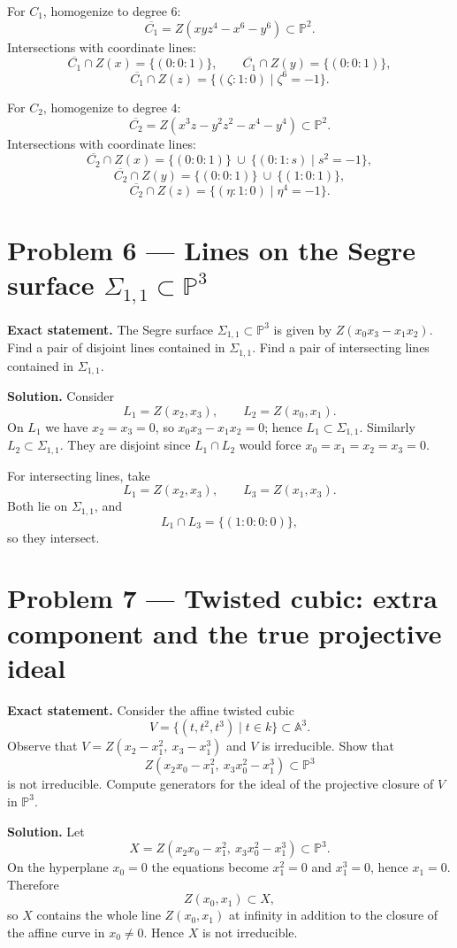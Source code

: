 \documentclass[12pt,a4paper]{article}
\theoremstyle{plain}
\theoremstyle{definition}      %
\begin{document}
For $C_1$, homogenize to degree $6$:
\[
\overline{C_1}=Z(xyz^4-x^6-y^6)\subset \mathbb{P}^2.
\]
Intersections with coordinate lines:
\[
\overline{C_1}\cap Z(x)=\{(0:0:1)\},
\qquad
\overline{C_1}\cap Z(y)=\{(0:0:1)\},
\]
\[
\overline{C_1}\cap Z(z)=\{(\zeta:1:0)\mid \zeta^6=-1\}.
\]

For $C_2$, homogenize to degree $4$:
\[
\overline{C_2}=Z(x^3z-y^2z^2-x^4-y^4)\subset \mathbb{P}^2.
\]
Intersections with coordinate lines:
\[
\overline{C_2}\cap Z(x)=\{(0:0:1)\}\ \cup\ \{(0:1:s)\mid s^2=-1\},
\]
\[
\overline{C_2}\cap Z(y)=\{(0:0:1)\}\ \cup\ \{(1:0:1)\},
\]
\[
\overline{C_2}\cap Z(z)=\{(\eta:1:0)\mid \eta^4=-1\}.
\]

\section*{Problem 6 — Lines on the Segre surface $\Sigma_{1,1}\subset \mathbb{P}^3$}

\textbf{Exact statement.}
The Segre surface $\Sigma_{1,1}\subset \mathbb{P}^3$ is given by $Z(x_0x_3-x_1x_2)$.
Find a pair of disjoint lines contained in $\Sigma_{1,1}$.
Find a pair of intersecting lines contained in $\Sigma_{1,1}$.

\textbf{Solution.}
Consider
\[
L_1=Z(x_2,x_3),
\qquad
L_2=Z(x_0,x_1).
\]
On $L_1$ we have $x_2=x_3=0$, so $x_0x_3-x_1x_2=0$; hence $L_1\subset \Sigma_{1,1}$.
Similarly $L_2\subset \Sigma_{1,1}$.
They are disjoint since $L_1\cap L_2$ would force $x_0=x_1=x_2=x_3=0$.

For intersecting lines, take
\[
L_1=Z(x_2,x_3),
\qquad
L_3=Z(x_1,x_3).
\]
Both lie on $\Sigma_{1,1}$, and
\[
L_1\cap L_3=\{(1:0:0:0)\},
\]
so they intersect.

\section*{Problem 7 — Twisted cubic: extra component and the true projective ideal}

\textbf{Exact statement.}
Consider the affine twisted cubic
\[
V=\{(t,t^2,t^3)\mid t\in k\}\subset \mathbb{A}^3.
\]
Observe that $V=Z(x_2-x_1^2,\ x_3-x_1^3)$ and $V$ is irreducible.
Show that
\[
Z(x_2x_0-x_1^2,\ x_3x_0^2-x_1^3)\subset \mathbb{P}^3
\]
is not irreducible.
Compute generators for the ideal of the projective closure of $V$ in $\mathbb{P}^3$.

\textbf{Solution.}
Let
\[
X=Z(x_2x_0-x_1^2,\ x_3x_0^2-x_1^3)\subset \mathbb{P}^3.
\]
On the hyperplane $x_0=0$ the equations become $x_1^2=0$ and $x_1^3=0$, hence $x_1=0$.
Therefore
\[
Z(x_0,x_1)\subset X,
\]
so $X$ contains the whole line $Z(x_0,x_1)$ at infinity in addition to the closure of the affine curve in $x_0\neq 0$.
Hence $X$ is not irreducible.
\end{document}
